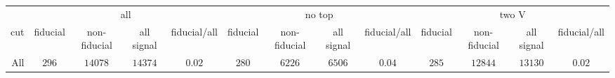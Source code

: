 \begin{tabular}{r|c|c|c|c|c|c|c|c|c|c|c|c|}
 &\multicolumn{4}{|c|}{all}&\multicolumn{4}{c|}{no top}&\multicolumn{4}{|c|}{two V}\\
cut&fiducial&non-fiducial&all signal&fiducial/all&fiducial&non-fiducial&all signal&fiducial/all&fiducial&non-fiducial&all signal&fiducial/all\\
\hline
All&$296$&$14078$&$14374$&$0.02$&$280$&$6226$&$6506$&$0.04$&$285$&$12844$&$13130$&$0.02$\\
\end{tabular}
